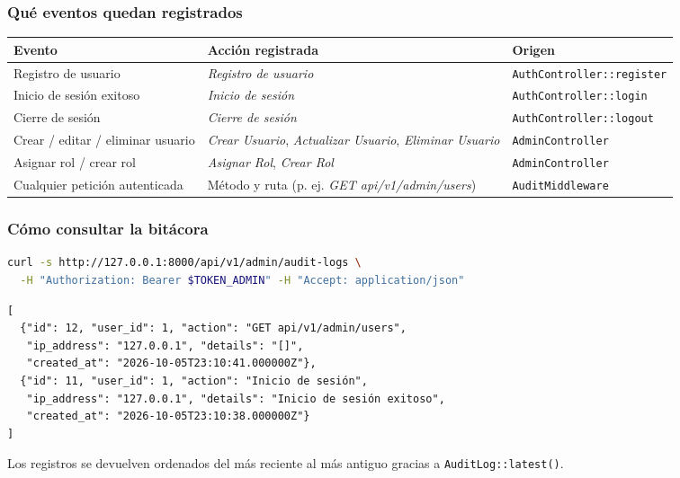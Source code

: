 \subsubsection{Qué eventos quedan registrados}
\begin{longtable}{p{4.5cm}p{4.2cm}p{6.3cm}}
\toprule
\textbf{Evento} & \textbf{Acción registrada} & \textbf{Origen} \\
\midrule
\endhead
Registro de usuario & \emph{Registro de usuario} & \texttt{AuthController::register} \\
Inicio de sesión exitoso & \emph{Inicio de sesión} & \texttt{AuthController::login} \\
Cierre de sesión & \emph{Cierre de sesión} & \texttt{AuthController::logout} \\
Crear / editar / eliminar usuario & \emph{Crear Usuario}, \emph{Actualizar Usuario}, \emph{Eliminar Usuario} & \texttt{AdminController} \\
Asignar rol / crear rol & \emph{Asignar Rol}, \emph{Crear Rol} & \texttt{AdminController} \\
Cualquier petición autenticada & Método y ruta (p. ej. \emph{GET api/v1/admin/users}) & \texttt{AuditMiddleware} \\
\bottomrule
\end{longtable}

\subsubsection{Cómo consultar la bitácora}
\begin{lstlisting}[language=bash]
curl -s http://127.0.0.1:8000/api/v1/admin/audit-logs \
  -H "Authorization: Bearer $TOKEN_ADMIN" -H "Accept: application/json"
\end{lstlisting}
\begin{lstlisting}[language={}, caption={Ejemplo de registros devueltos}]
[
  {"id": 12, "user_id": 1, "action": "GET api/v1/admin/users",
   "ip_address": "127.0.0.1", "details": "[]",
   "created_at": "2026-10-05T23:10:41.000000Z"},
  {"id": 11, "user_id": 1, "action": "Inicio de sesión",
   "ip_address": "127.0.0.1", "details": "Inicio de sesión exitoso",
   "created_at": "2026-10-05T23:10:38.000000Z"}
]
\end{lstlisting}
Los registros se devuelven ordenados del más reciente al más antiguo gracias a \texttt{AuditLog::latest()}.

